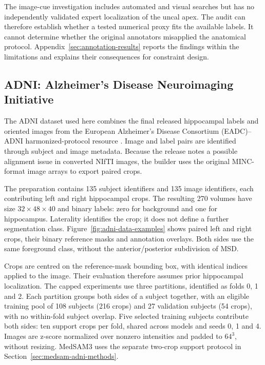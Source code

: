 \documentclass[12pt,a4paper]{article}
\begin{document}
The image-cue investigation includes automated and visual searches but
has no independently validated expert localization of the uncal apex.
The audit can therefore establish whether a tested numerical proxy fits
the available labels. It cannot determine whether the original annotators
misapplied the anatomical protocol. Appendix~\ref{sec:annotation-results}
reports the findings within the limitations and explains their
consequences for constraint design.


\subsection{ADNI: Alzheimer's Disease Neuroimaging Initiative}
\label{sec:adni-methods}

The ADNI dataset used here combines the final released hippocampal labels
and oriented images from the European Alzheimer's Disease Consortium
(EADC)--ADNI harmonized-protocol resource \cite{harpReleasedLabels}. Image
and label pairs are identified through subject and image metadata. Because
the release notes a possible alignment issue in converted NIfTI images, the
builder uses the original MINC-format image arrays to export paired crops.

The preparation contains 135 subject identifiers and 135 image
identifiers, each contributing left and right hippocampal crops.
The resulting 270 volumes have size $32\times48\times40$ and binary
labels: zero for background and one for hippocampus. Laterality
identifies the crop; it does not define a further segmentation class.
Figure~\ref{fig:adni-data-examples} shows paired left and right crops,
their binary reference masks and annotation overlays. Both sides use
the same foreground class, without the anterior/posterior subdivision
of MSD.


Crops are centred on the reference-mask bounding box, with identical
indices applied to the image. Their evaluation therefore assumes prior
hippocampal localization. The capped experiments use three partitions,
identified as folds 0, 1 and 2. Each partition groups both sides of a
subject together, with an eligible training pool of 108 subjects
(216 crops) and 27 validation subjects (54 crops), with no within-fold
subject overlap. Five selected training subjects contribute both sides:
ten support crops per fold, shared across models and seeds 0, 1 and 4.
Images are
z-score normalized over nonzero intensities and padded to $64^3$,
without resizing. MedSAM3 uses the separate
two-crop support protocol in Section~\ref{sec:medsam-adni-methods}.
\end{document}
